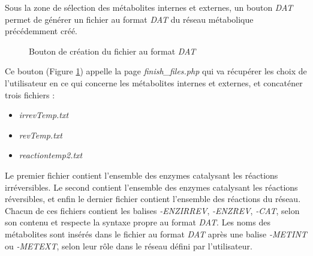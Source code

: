 Sous la zone de sélection des métabolites internes et externes, un bouton \emph{DAT} permet de générer un fichier au format \emph{DAT} du réseau métabolique précédemment créé. \\

\begin{figure}[!ht]
    \begin{center}
        \caption{Bouton de création du fichier au format \emph{DAT}}
          \label{boutonDAT}
      \end{center}   
\end{figure}

Ce bouton (Figure \ref{boutonDAT}) appelle la page \emph{finish\_files.php} qui va  récupérer les choix de l'utilisateur en ce qui concerne les métabolites internes et externes, et concaténer trois fichiers :
\begin{itemize}
\item \emph{irrevTemp.txt}
\item \emph{revTemp.txt}
\item \emph{reactiontemp2.txt}
\end{itemize}

Le premier fichier contient l'ensemble des enzymes catalysant les réactions irréversibles. Le second contient l'ensemble des enzymes catalysant les réactions réversibles, et enfin le dernier fichier contient l'ensemble des réactions du réseau. \\
Chacun de ces fichiers contient les balises \emph{-ENZIRREV}, \emph{-ENZREV}, \emph{-CAT}, selon son contenu et respecte la syntaxe propre au format \emph{DAT}.
Les noms des métabolites sont insérés dans le fichier au format \emph{DAT} après une balise \emph{-METINT} ou \emph{-METEXT}, selon leur rôle dans le réseau défini par l'utilisateur.

